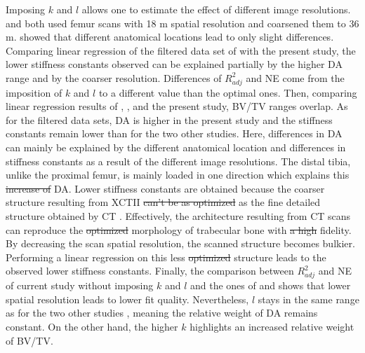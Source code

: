 \documentclass[a4paper,fleqn]{DC_ArtStyle}
\providecommand{\DIFadd}[1]{{\protect\color{blue}{#1}}} %
\providecommand{\DIFdel}[1]{{\protect\color{red}\sout{#1}}}                      %
\providecommand{\DIFaddbegin}{} %
\providecommand{\DIFaddend}{} %
\providecommand{\DIFdelbegin}{} %
\providecommand{\DIFdelend}{} %
\begin{document}
\DIFdelend Imposing $k$ and $l$ allows one to \DIFaddbegin \DIFadd{compare the other regressions parameters and }\DIFaddend estimate the effect of different image resolutions.  \citeauthor{Panyasantisuk2015}\cite{Panyasantisuk2015} and \citeauthor{Gross2013}\cite{Gross2013} both used femur scans with 18 \si{\micro}m spatial resolution and coarsened them to 36 \si{\micro}m. \citeauthor{Gross2013}\cite{Gross2013} showed that different anatomical locations lead to only slight differences. Comparing linear regression of the filtered data set of \citeauthor{Panyasantisuk2015}\cite{Panyasantisuk2015} with the present study, the lower stiffness constants observed can be explained partially by the higher DA range and by the coarser resolution. Differences of $R^2_{adj}$ and NE come from the imposition of $k$ and $l$ to a different value than the optimal ones. Then, comparing linear regression results of \citeauthor{Panyasantisuk2015}\cite{Panyasantisuk2015}, \citeauthor{Gross2013}\cite{Gross2013}, and the present study, BV/TV ranges overlap. As for the filtered data sets, DA is higher in the present study and the stiffness constants remain lower than for the two other studies. Here, differences in DA can mainly be explained by the different anatomical location and differences in stiffness constants as a result of the different image resolutions. The distal tibia, unlike the proximal femur, is mainly loaded in one direction which explains this \DIFdelbegin \DIFdel{increase of }\DIFdelend \DIFaddbegin \DIFadd{higher }\DIFaddend DA. Lower stiffness constants are obtained because the coarser structure resulting from XCTII \DIFdelbegin \DIFdel{can't be as optimized }\DIFdelend \DIFaddbegin \DIFadd{cannot be as optimised }\DIFaddend as the fine detailed structure obtained by \si{\micro}CT \DIFaddbegin \DIFadd{for the same BV/TV}\DIFaddend . Effectively, the architecture resulting from \si{\micro}CT scans can reproduce the \DIFdelbegin \DIFdel{optimized }\DIFdelend \DIFaddbegin \DIFadd{optimised }\DIFaddend morphology of trabecular bone with \DIFdelbegin \DIFdel{a high }\DIFdelend \DIFaddbegin \DIFadd{higher }\DIFaddend fidelity. By decreasing the scan spatial resolution, the scanned structure becomes bulkier. Performing a linear regression on this less \DIFdelbegin \DIFdel{optimized }\DIFdelend \DIFaddbegin \DIFadd{optimised }\DIFaddend structure leads to the observed lower stiffness constants. Finally, the comparison between $R^2_{adj}$ and NE of current study without imposing $k$ and $l$ and the ones of \citeauthor{Panyasantisuk2015}\cite{Panyasantisuk2015} and  \citeauthor{Gross2013}\cite{Gross2013} shows that lower spatial resolution leads to lower fit quality. Nevertheless, $l$ stays in the same range as for the two other studies \cite{Gross2013,Panyasantisuk2015}, meaning the relative weight of DA remains constant. On the other hand, the higher $k$ highlights an increased relative weight of BV/TV. \\
\DIFdelbegin %
\end{document}
